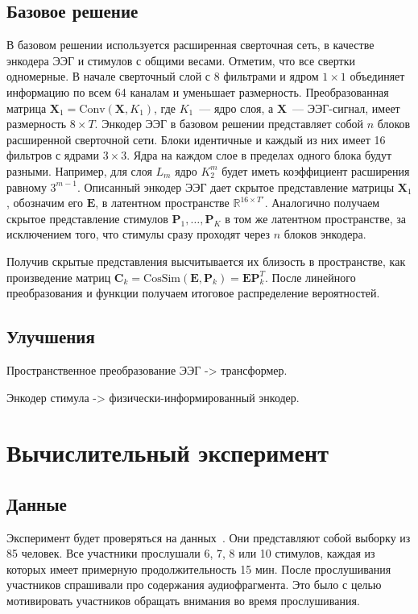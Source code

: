 \documentclass{article}
\begin{document}
    \subsection{Базовое решение}
    В базовом решении используется расширенная сверточная сеть, в качестве энкодера ЭЭГ и стимулов с общими весами. Отметим, что все свертки одномерные. В начале сверточный слой с 8 фильтрами  и ядром $1 \times 1$ объединяет информацию по всем 64 каналам и уменьшает размерность. Преобразованная матрица $\mathbf{X}_1 = \mathrm{Conv}(\mathbf{X}, K_1)$, где $K_1$~--- ядро слоя, а $\mathbf{X}$~--- ЭЭГ-сигнал, имеет размерность $8 \times T$. Энкодер ЭЭГ в базовом решении представляет собой $n$ блоков расширенной сверточной сети. Блоки идентичные и каждый из них имеет 16 фильтров с ядрами $3 \times 3$. Ядра на каждом слое в пределах одного блока будут разными. Например, для слоя $L_m$ ядро $K_2^m$ будет иметь коэффициент расширения равному $3^{m-1}$. Описанный энкодер ЭЭГ дает скрытое представление матрицы $\mathbf{X}_1$, обозначим его $\mathbf{E}$, в латентном пространстве $\mathbb{R}^{16 \times T'}$. Аналогично получаем скрытое представление стимулов $\mathbf{P}_1, \dots, \mathbf{P}_K$ в том же латентном пространстве, за исключением того, что стимулы сразу проходят через $n$  блоков энкодера.
    
    Получив скрытые представления высчитывается их близость в пространстве, как произведение матриц $\mathbf{C}_k = \mathrm{CosSim}(\mathbf{E}, \mathbf{P}_k) = \mathbf{E} \mathbf{P}_k^T$. После линейного преобразования и функции  получаем итоговое распределение вероятностей.

    \subsection{Улучшения}
    Пространственное преобразование ЭЭГ -> трансформер.

    Энкодер стимула -> физически-информированный энкодер.

\section{Вычислительный эксперимент}
\subsection{Данные}
    Эксперимент будет проверяться на данных~\citep{K3VSND_2023}. Они представляют собой выборку из 85 человек. Все участники прослушали 6, 7, 8 или 10 стимулов, каждая из которых имеет примерную продолжительность 15 мин. После прослушивания участников спрашивали про содержания аудиофрагмента. Это было с целью мотивировать участников обращать внимания во время прослушивания.
\end{document}
